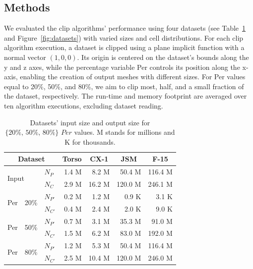 \documentclass{egpubl}
\begin{document}
\subsection{Methods}

We evaluated the clip algorithms' performance using four datasets (see Table~\ref{tab:datasets} and Figure~\ref{fig:datasets}) with varied sizes and cell distributions. For each clip algorithm execution, a dataset is clipped using a plane implicit function with a normal vector $(1, 0, 0)$. Its origin is centered on the dataset's bounds along the y and z axes, while the percentage variable Per controls its position along the x-axis, enabling the creation of output meshes with different sizes. For Per values equal to 20\%, 50\%, and 80\%, we aim to clip most, half, and a small fraction of the dataset, respectively. The run-time and memory footprint are averaged over ten algorithm executions, excluding dataset reading.

\begin{table}[H]
\centering
\caption{Datasets' input size and output size for  $\textit{\{20\%, 50\%, 80\%\}}$ $Per$ values. M stands for millions and K for thousands.}
\label{tab:datasets}
\begin{tabular}{lllrrrr}
\toprule
\multicolumn{3}{c}{Dataset}                            & \multicolumn{1}{c}{Torso} & \multicolumn{1}{c}{CX-1} & \multicolumn{1}{c}{JSM} & \multicolumn{1}{c}{F-15} \\
\midrule
\multicolumn{2}{l}{\multirow{2}{*}{Input}}  &   $N_P$    &  1.4 M  &   8.2 M  &   50.4 M  &  116.4 M  \\
\multicolumn{2}{l}{}                        &   $N_C$    &  2.9 M  &  16.2 M  &  120.0 M  &  246.1 M  \\
\midrule
\multirow{2}{*}{Per} & \multirow{2}{*}{20\%} &  $N_{P'}$  &  0.2 M  &   1.2 M  &    0.9 K  &    3.1 K  \\
                     &                      &  $N_{C'}$  &  0.4 M  &   2.4 M  &    2.0 K  &    9.0 K  \\
\midrule
\multirow{2}{*}{Per} & \multirow{2}{*}{50\%} &  $N_{P'}$  &  0.7 M  &   3.1 M  &   35.3 M  &   91.0 M  \\
                     &                      &  $N_{C'}$  &  1.5 M  &   6.2 M  &   83.0 M  &  192.0 M  \\
\midrule
\multirow{2}{*}{Per} & \multirow{2}{*}{80\%} &  $N_{P'}$  &  1.2 M  &   5.3 M  &   50.4 M  &  116.4 M  \\
                     &                      &  $N_{C'}$  &  2.5 M  &  10.4 M  &  120.0 M  &  246.0 M  \\
\bottomrule
\end{tabular}
\end{table}
\end{document}
